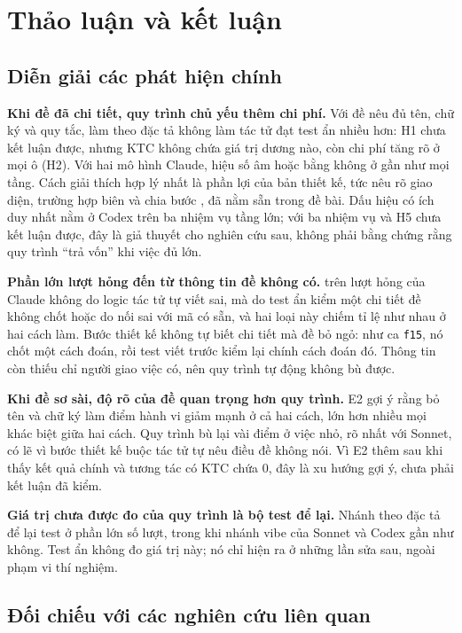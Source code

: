 \section{Thảo luận và kết luận}\label{sec:discussion}

\subsection{Diễn giải các phát hiện chính}

\textbf{Khi đề đã chi tiết, quy trình chủ yếu thêm chi phí.} Với đề nêu đủ tên, chữ ký và quy tắc, làm theo đặc
tả không làm tác tử đạt test ẩn nhiều hơn: H1 chưa kết luận được, nhưng KTC không chứa giá trị dương nào, còn
chi phí tăng rõ ở mọi ô (H2). Với hai mô hình Claude, hiệu số âm hoặc bằng không ở gần như mọi tầng. Cách giải
thích hợp lý nhất là phần lợi của bản thiết kế, tức nêu rõ giao diện, trường hợp biên và chia bước
\cite{zi_2025}, đã nằm sẵn trong đề bài. Dấu hiệu có ích duy nhất nằm ở Codex trên ba nhiệm vụ tầng lớn; với ba
nhiệm vụ và H5 chưa kết luận được, đây là giả thuyết cho nghiên cứu sau, không phải bằng chứng rằng quy trình
``trả vốn'' khi việc đủ lớn.

\textbf{Phần lớn lượt hỏng đến từ thông tin đề không có.} \NumLabOutside{} trên \NumLabRuns{} lượt hỏng của
Claude không do logic tác tử tự viết sai, mà do test ẩn kiểm một chi tiết đề không chốt hoặc do nối sai với mã có
sẵn, và hai loại này chiếm tỉ lệ như nhau ở hai cách làm. Bước thiết kế không tự biết chi tiết mà đề bỏ ngỏ: như
ca \texttt{f15}, nó chốt một cách đoán, rồi test viết trước kiểm lại chính cách đoán đó. Thông tin còn thiếu chỉ
người giao việc có, nên quy trình tự động không bù được.

\textbf{Khi đề sơ sài, độ rõ của đề quan trọng hơn quy trình.} E2 gợi ý rằng bỏ tên và chữ ký làm điểm hành vi
giảm mạnh ở cả hai cách, lớn hơn nhiều mọi khác biệt giữa hai cách. Quy trình bù lại vài điểm ở việc nhỏ, rõ
nhất với Sonnet, có lẽ vì bước thiết kế buộc tác tử tự nêu điều đề không nói. Vì E2 thêm sau khi thấy kết quả
chính và tương tác có KTC chứa 0, đây là xu hướng gợi ý, chưa phải kết luận đã kiểm.

\textbf{Giá trị chưa được đo của quy trình là bộ test để lại.} Nhánh theo đặc tả để lại test ở phần lớn số lượt,
trong khi nhánh vibe của Sonnet và Codex gần như không. Test ẩn không đo giá trị này; nó chỉ hiện ra ở những lần
sửa sau, ngoài phạm vi thí nghiệm.

\subsection{Đối chiếu với các nghiên cứu liên quan}


